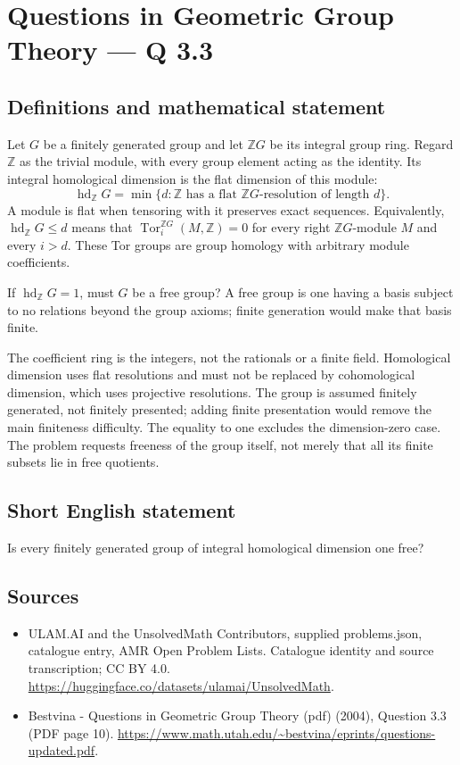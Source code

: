 \documentclass[11pt,a4paper]{article}
\begin{document}
\section*{Questions in Geometric Group Theory — Q 3.3}\label{statement}

\subsection{Definitions and mathematical statement}
Let $G$ be a finitely generated group and let $\mathbb ZG$ be its integral group ring. Regard $\mathbb Z$ as the trivial module, with every group element acting as the identity. Its integral homological dimension is the flat dimension of this module:
\[
 \operatorname{hd}_{\mathbb Z}G
   =\min\{d:\mathbb Z\text{ has a flat }\mathbb ZG
                 \text{-resolution of length }d\}.
\]
A module is flat when tensoring with it preserves exact sequences. Equivalently, $\operatorname{hd}_{\mathbb Z}G\leq d$ means that $\operatorname{Tor}^{\mathbb ZG}_i(M,\mathbb Z)=0$ for every right $\mathbb ZG$-module $M$ and every $i>d$. These Tor groups are group homology with arbitrary module coefficients.

If $\operatorname{hd}_{\mathbb Z}G=1$, must $G$ be a free group? A free group is one having a basis subject to no relations beyond the group axioms; finite generation would make that basis finite.

The coefficient ring is the integers, not the rationals or a finite field. Homological dimension uses flat resolutions and must not be replaced by cohomological dimension, which uses projective resolutions. The group is assumed finitely generated, not finitely presented; adding finite presentation would remove the main finiteness difficulty. The equality to one excludes the dimension-zero case. The problem requests freeness of the group itself, not merely that all its finite subsets lie in free quotients.
\subsection{Short English statement}
Is every finitely generated group of integral homological dimension one free?
\subsection{Sources}
\begin{itemize}
\item[S1] ULAM.AI and the UnsolvedMath Contributors, supplied problems.json, catalogue entry, AMR Open Problem Lists. Catalogue identity and source transcription; CC BY 4.0.
\url{https://huggingface.co/datasets/ulamai/UnsolvedMath}.
\item[S2] Bestvina - Questions in Geometric Group Theory (pdf) (2004), Question 3.3 (PDF page 10). 
\url{https://www.math.utah.edu/~bestvina/eprints/questions-updated.pdf}.
\end{itemize}
\end{document}
